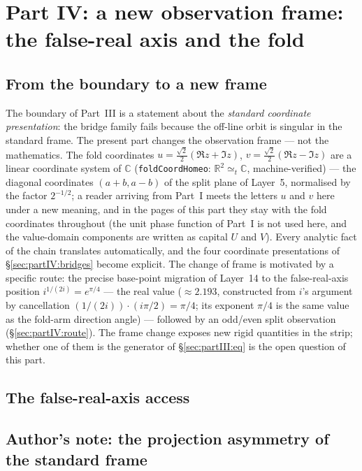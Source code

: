 \documentclass{article}
\begin{document}
\section{Part IV: a new observation frame: the false-real axis and the fold}
\label{sec:partIV}

\subsection{From the boundary to a new frame}
\label{sec:partIV:motive}

The boundary of Part~III is a statement about the \emph{standard
coordinate presentation}: the bridge family fails because the off-line
orbit is singular in the standard frame. The present part changes the
observation frame --- not the mathematics. The fold coordinates
$u=\frac{\sqrt2}{2}(\Re z+\Im z)$, $v=\frac{\sqrt2}{2}(\Re z-\Im z)$
are a linear coordinate system of $\mathbb C$
(\texttt{foldCoordHomeo}: $\mathbb R^2\simeq_t\mathbb C$,
machine-verified) --- the diagonal coordinates $(a+b,a-b)$ of the
split plane of Layer~5, normalised by the factor $2^{-1/2}$; a reader
arriving from Part~I meets the letters $u$ and $v$ here under a new
meaning, and in the pages of this part they stay with the fold
coordinates throughout (the unit phase function of Part~I is not used
here, and the value-domain components are written as capital $U$ and
$V$). Every
analytic fact of the chain translates
automatically, and the four coordinate presentations of
\S\ref{sec:partIV:bridges} become explicit. The change of frame is
motivated by a specific route: the precise base-point migration of
Layer~14 to the false-real-axis position
$i^{1/(2i)}=e^{\pi/4}$ --- the real value ($\approx2.193$, constructed
from $i$'s argument by cancellation $(1/(2i))\cdot(i\pi/2)=\pi/4$;
its exponent $\pi/4$ is the same value as the fold-arm direction
angle) --- followed by an odd/even split observation
(\S\ref{sec:partIV:route}). The frame change exposes new rigid
quantities in the strip; whether one of them is the generator of
\S\ref{sec:partIII:eq} is the open question of this part.

\subsection{The false-real-axis access}

\subsection*{Author's note: the projection asymmetry of the standard frame}
\label{sec:partIV:asym}
\end{document}
